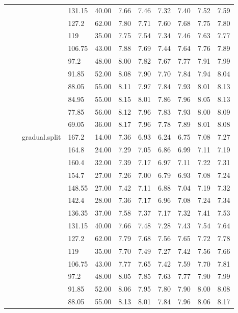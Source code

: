 \begin{longtable}{llllrrrrrrr}
   &  &  & 131.15 & 40.00 & 7.66 & 7.46 & 7.32 & 7.40 & 7.52 & 7.59 \\ 
   &  &  & 127.2 & 62.00 & 7.80 & 7.71 & 7.60 & 7.68 & 7.75 & 7.80 \\ 
   &  &  & 119 & 35.00 & 7.75 & 7.54 & 7.34 & 7.46 & 7.63 & 7.77 \\ 
   &  &  & 106.75 & 43.00 & 7.88 & 7.69 & 7.44 & 7.64 & 7.76 & 7.89 \\ 
   &  &  & 97.2 & 48.00 & 8.00 & 7.82 & 7.67 & 7.77 & 7.91 & 7.99 \\ 
   &  &  & 91.85 & 52.00 & 8.08 & 7.90 & 7.70 & 7.84 & 7.94 & 8.04 \\ 
   &  &  & 88.05 & 55.00 & 8.11 & 7.97 & 7.84 & 7.93 & 8.01 & 8.13 \\ 
   &  &  & 84.95 & 55.00 & 8.15 & 8.01 & 7.86 & 7.96 & 8.05 & 8.13 \\ 
   &  &  & 77.85 & 56.00 & 8.12 & 7.96 & 7.83 & 7.93 & 8.00 & 8.09 \\ 
   &  &  & 69.05 & 36.00 & 8.17 & 7.96 & 7.78 & 7.89 & 8.01 & 8.08 \\ 
   &  & gradual.split & 167.2 & 14.00 & 7.36 & 6.93 & 6.24 & 6.75 & 7.08 & 7.27 \\ 
   &  &  & 164.8 & 24.00 & 7.29 & 7.05 & 6.86 & 6.99 & 7.11 & 7.19 \\ 
   &  &  & 160.4 & 32.00 & 7.39 & 7.17 & 6.97 & 7.11 & 7.22 & 7.31 \\ 
   &  &  & 154.7 & 27.00 & 7.26 & 7.00 & 6.79 & 6.93 & 7.08 & 7.24 \\ 
   &  &  & 148.55 & 27.00 & 7.42 & 7.11 & 6.88 & 7.04 & 7.19 & 7.32 \\ 
   &  &  & 142.4 & 28.00 & 7.36 & 7.17 & 6.96 & 7.08 & 7.24 & 7.34 \\ 
   &  &  & 136.35 & 37.00 & 7.58 & 7.37 & 7.17 & 7.32 & 7.41 & 7.53 \\ 
   &  &  & 131.15 & 40.00 & 7.66 & 7.48 & 7.28 & 7.43 & 7.54 & 7.64 \\ 
   &  &  & 127.2 & 62.00 & 7.79 & 7.68 & 7.56 & 7.65 & 7.72 & 7.78 \\ 
   &  &  & 119 & 35.00 & 7.70 & 7.49 & 7.27 & 7.42 & 7.56 & 7.66 \\ 
   &  &  & 106.75 & 43.00 & 7.77 & 7.65 & 7.42 & 7.59 & 7.70 & 7.81 \\ 
   &  &  & 97.2 & 48.00 & 8.05 & 7.85 & 7.63 & 7.77 & 7.90 & 7.99 \\ 
   &  &  & 91.85 & 52.00 & 8.06 & 7.95 & 7.80 & 7.90 & 8.00 & 8.08 \\ 
   &  &  & 88.05 & 55.00 & 8.13 & 8.01 & 7.84 & 7.96 & 8.06 & 8.17 \\ 

\end{longtable}
